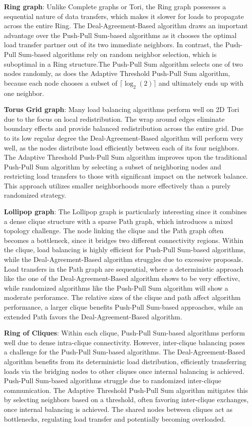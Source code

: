 \textbf{Ring graph}: Unlike Complete graphs or Tori, the Ring graph possesses a sequential nature of data transfers, which makes it slower for loads to propagate across the entire Ring. The Deal-Agreement-Based algorithm draws an important advantage over the Push-Pull Sum-based algorithms as it chooses the optimal load transfer partner out of its two immediate neighbors. In contrast, the Push-Pull Sum-based algorithms rely on random neighbor selection, which is suboptimal in a Ring structure.The Push-Pull Sum algorithm selects one of two nodes randomly, as does the Adaptive Threshold Push-Pull Sum algorithm, because each node chooses a subset of $\lceil \log_{2}{(2)} \rceil$ and ultimately ends up with one neighbor.

\textbf{Torus Grid graph}: Many load balancing algorithms perform well on 2D Tori due to the focus on local redistribution. The wrap around edges eliminate boundary effects and provide balanced redistribution across the entire grid. Due to its low regular degree the Deal-Agreement-Based algorithm will perform very well, as the nodes distribute load efficiently between each of its four neighbors. The Adaptive Threshold Push-Pull Sum algorithm improves upon the traditional Push-Pull Sum algorithm by selecting a subset of neighboring nodes and restricting load transfers to those with significant impact on the network balance. This approach utilizes smaller neighborhoods more effectively than a purely randomized strategy.

\textbf{Lollipop graph}: The Lollipop graph is particularly interesting since it combines a dense clique structure with a sparse Path graph, which introduces a mixed topology challenge. The node linking the clique and the Path graph often becomes a bottleneck, since it bridges two different connectivity regions. Within the clique, load balancing is highly efficient for Push-Pull Sum-based algorithms, while the Deal-Agreement-Based algorithm struggles due to excessive proposals. Load transfers in the Path graph are sequential, where a deterministic approach like the one of the Deal-Agreement-Based algorithm shows to be very effective, while randomized algorithms like the Push-Pull Sum algorithm will show a moderate perforamce. The relative sizes of the clique and path affect algorithm performance, a larger clique benefits Push-Pull Sum-based approaches, while an extended Path favors the Deal-Agreement-Based algorithm.

\textbf{Ring of Cliques}: Within each clique, Push-Pull Sum-based algorithms perform well due to dense intra-clique connectivity. However, inter-clique balancing poses a challenge for the Push-Pull Sum-based algorithms. The Deal-Agreement-Based algorithm benefits from its deterministic load distribution, efficiently transferring loads via the bridging nodes to other cliques once internal balancing is achieved. Push-Pull Sum-based algorithms struggle due to randomized inter-clique communication. The Adaptive Threshold Push-Pull Sum algorithm mitigates this by selecting neighbors based on a threshold, often favoring inter-clique exchanges, once internal balancing is achieved. The shared nodes between cliques act as bottlenecks, regulating load transfer and potentially becoming overloaded.
